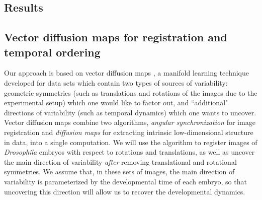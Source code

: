 \documentclass{pnastwo}
\begin{document}
\begin{article}
\section{Results}

\subsection{Vector diffusion maps for registration and temporal ordering}

%
%
%
Our approach is based on vector diffusion maps \cite{singer2012vector}, a manifold learning
technique developed for data sets which contain two types of sources of variability:
geometric symmetries (such as translations and rotations of the images due to the experimental setup) which one would like to factor out,
and ``additional" directions of variability (such as temporal dynamics) which one wants to uncover.
%
Vector diffusion maps combine two algorithms, {\em angular synchronization} \cite{singer2011angular} for image registration and {\em diffusion maps} \cite{coifman2005geometric} for extracting intrinsic low-dimensional structure in data, into a single computation.
%
%
We will use the algorithm to register images of {\it Drosophila} embryos with respect to rotations and translations, as well as uncover the main direction of variability {\it after} removing translational and rotational symmetries.
%
We assume that, in these sets of images, the main direction of variability is parameterized by the developmental time of each embryo, so that uncovering this direction will allow us to recover the developmental dynamics.


\end{article}
\end{document}
